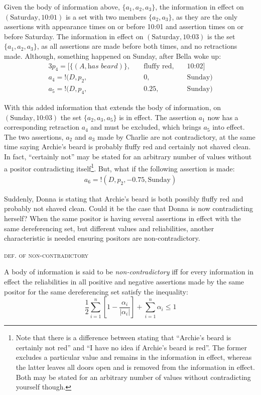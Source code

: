 \documentclass[sfsidenotes,nobib,twoside,symmetric]{tufte-handout}
\newcommand{\assert}{\text{!}}
\newcounter{majorcount}
\newcommand{\deffy}[3]{
	\vspace{2ex}
	\refstepcounter{majorcount} 
	\noindent\textsc{#1}%
	\\\begin{small}
	\noindent #2%
	\label{Def:#3}
	\end{small}
	\vspace{2ex}
}
\begin{document}
Given the body of information above, $\{a_1, a_2, a_3\}$, the information in effect on $(\textrm{Saturday}, \textrm{10:01})$ is a set with two members $\{a_2, a_3\}$, as they are the only assertions with appearance times on or before 10:01 and assertion times on or before Saturday. The information in effect on $(\textrm{Saturday}, \textrm{10:03})$ is the set $\{a_1, a_2, a_3\}$, as all assertions are made before both times, and no retractions made. Although, something happened on Sunday, after Bella woke up:
\begin{alignat*}{3}
p_{4} = [\{(A, \textit{has beard})\},\;&& \textrm{fluffy red},\;&& \textrm{10:02}] \\
a_4 = \assert(D, p_{2},\;&& 0,\;&& \textrm{Sunday}) \\
a_5 = \assert(D, p_{4},\;&& 0.25,\;&& \textrm{Sunday}) 
\end{alignat*}

With this added information that extends the body of information, on $(\textrm{Sunday}, \textrm{10:03})$ the set $\{a_2, a_3, a_5\}$ is in effect. The assertion $a_1$ now has a corresponding retraction $a_4$ and must be excluded, which brings $a_5$ into effect. The two assertions, $a_2$ and $a_3$ made by Charlie are not contradictory, at the same time saying Archie's beard is probably fluffy red and certainly not shaved clean. In fact, \enquote{certainly not} may be stated for an arbitrary number of values without a positor contradicting itself\footnote{Note that there is a difference between stating that \enquote{Archie's beard is certainly not red} and \enquote{I have no idea if Archie's beard is red}. The former excludes a particular value and remains in the information in effect, whereas the latter leaves all doors open and is removed from the information in effect. Both may be stated for an arbitrary number of values without contradicting yourself though.}. But, what if the following assertion is made:
\begin{align*}
a_6 = \assert(D, p_2, -0.75, \textrm{Sunday}) 
\end{align*}

Suddenly, Donna is stating that Archie's beard is both possibly fluffy red and probably not shaved clean. Could it be the case that Donna is now contradicting herself? When the same positor is having several assertions in effect with the same dereferencing set, but different values and reliabilities, another characteristic is needed ensuring positors are non-contradictory.

\deffy{def. of non-contradictory}{%
A body of information is said to be \emph{non-contradictory} iff for every information in effect the reliabilities in all positive and negative assertions made by the same positor for the same dereferencing set satisfy the inequality: $$\frac{1}{2}\sum_{i = 1}^{n}\left[1 - \frac{\alpha_i}{|\alpha_i|}\right ] + \sum_{i = 1}^{n}\alpha_i \leq 1$$
}{contradictions}
\end{document}
